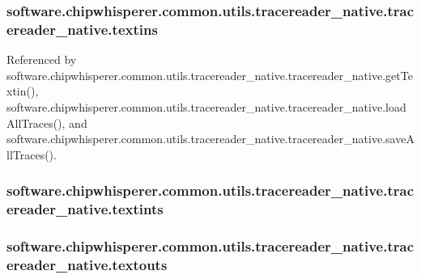 \subsubsection[{textins}]{\setlength{\rightskip}{0pt plus 5cm}software.\+chipwhisperer.\+common.\+utils.\+tracereader\+\_\+native.\+tracereader\+\_\+native.\+textins}\label{classsoftware_1_1chipwhisperer_1_1common_1_1utils_1_1tracereader__native_1_1tracereader__native_a57f4442d5bfd86a3ec976bffab9d46f3}


Referenced by software.\+chipwhisperer.\+common.\+utils.\+tracereader\+\_\+native.\+tracereader\+\_\+native.\+get\+Textin(), software.\+chipwhisperer.\+common.\+utils.\+tracereader\+\_\+native.\+tracereader\+\_\+native.\+load\+All\+Traces(), and software.\+chipwhisperer.\+common.\+utils.\+tracereader\+\_\+native.\+tracereader\+\_\+native.\+save\+All\+Traces().

\hypertarget{classsoftware_1_1chipwhisperer_1_1common_1_1utils_1_1tracereader__native_1_1tracereader__native_a834a98711724a5cc63e7f623aaeac2b2}{}
\subsubsection[{textints}]{\setlength{\rightskip}{0pt plus 5cm}software.\+chipwhisperer.\+common.\+utils.\+tracereader\+\_\+native.\+tracereader\+\_\+native.\+textints}\label{classsoftware_1_1chipwhisperer_1_1common_1_1utils_1_1tracereader__native_1_1tracereader__native_a834a98711724a5cc63e7f623aaeac2b2}
\hypertarget{classsoftware_1_1chipwhisperer_1_1common_1_1utils_1_1tracereader__native_1_1tracereader__native_a5174df9426a6acc5b183110b4c333417}{}
\subsubsection[{textouts}]{\setlength{\rightskip}{0pt plus 5cm}software.\+chipwhisperer.\+common.\+utils.\+tracereader\+\_\+native.\+tracereader\+\_\+native.\+textouts}\label{classsoftware_1_1chipwhisperer_1_1common_1_1utils_1_1tracereader__native_1_1tracereader__native_a5174df9426a6acc5b183110b4c333417}


